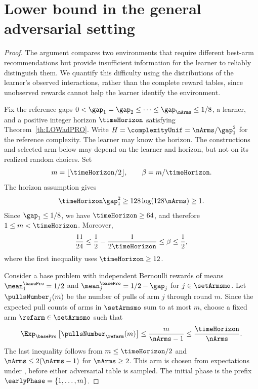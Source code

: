 \section{Lower bound in the general adversarial setting} %
\label{app:prooflowadPRO}
%
	\setcounter{scratchcounter}{\value{theorem}}
\toto*
\setcounter{theorem}{\the\numexpr\value{scratchcounter}}
\begin{proof}%
The argument compares two environments that require different best-arm
recommendations but provide insufficient information for the learner to
reliably distinguish them. We quantify this difficulty using the distributions
of the learner's observed interactions, rather than the complete reward
tables, since unobserved rewards cannot help the learner identify the
environment.

Fix the reference gaps
$0<\gap_1=\gap_2\leq\cdots\leq\gap_{\nArms}\leq1/8$,
a learner, and a positive integer horizon $\timeHorizon$ satisfying
Theorem~\ref{th:LOWadPRO}. Write
$H=\complexityUnif=\nArms/\gap_1^2$ for the reference complexity.
The learner may know the horizon. The constructions and selected arm
below may depend on the learner and horizon, but not on its realized
random choices. Set
\[
m=\lfloor\timeHorizon/2\rfloor,\qquad \beta=m/\timeHorizon.
\]
The horizon assumption gives
\[
\timeHorizon\gap_1^2\geq128\log(128\nArms)\geq1.
\]
Since $\gap_1\leq1/8$, we have $\timeHorizon\geq64$, and therefore
$1\leq m<\timeHorizon$. Moreover,
\[
\frac{11}{24}\leq\frac12-\frac{1}{2\timeHorizon}
\leq\beta\leq\frac12,
\]
where the first inequality uses $\timeHorizon\geq12$.

Consider a base problem \basePro{} with independent Bernoulli rewards
of means $\mean_1^{\basePro}=1/2$ and
$\mean_j^{\basePro}=1/2-\gap_j$ for $j\in\setArmsmo$.
Let $\pullsNumber_j(m)$ be the number of pulls of arm $j$ through
round $m$. Since the expected pull counts of arms in $\setArmsmo$
sum to at most $m$, choose a fixed arm $\refarm\in\setArmsmo$ such that
\begin{equation}\label{eq:notSoMuchPullsAD}
\Exp_{\basePro}\left[\pullsNumber_{\refarm}(m)\right]
\leq\frac{m}{\nArms-1}\leq\frac{\timeHorizon}{\nArms}.
\end{equation}
The last inequality follows from $m\leq\timeHorizon/2$ and
$\nArms\leq2(\nArms-1)$ for $\nArms\geq2$.
This arm is chosen from expectations under \basePro{}, before either
adversarial table is sampled. The initial phase is the prefix
$\earlyPhase=\{1,\ldots,m\}$.


\end{proof}
